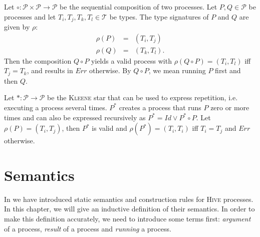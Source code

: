 \begin{definition}
\label{def:static_sequence}
Let $\circ \colon \mathcal{P} \times \mathcal{P} \to \mathcal{P}$ be the sequential composition of two processes. Let $P, Q \in \mathcal{P}$ be processes and let $T_i, T_j, T_k, T_l \in \mathcal{T}$ be types. The type signatures of $P$ and $Q$ are given by $\rho$: 
\begin{eqnarray*}
  \rho \left( P \right) & = & \left( T_i, T_j \right) \\
  \rho \left( Q \right) & = & \left( T_k, T_l \right).
\end{eqnarray*}
Then the composition $Q \circ P$ yields a valid process with $\rho \left( Q \circ P \right) = \left( T_i, T_l \right)$ iff $T_j = T_k$, and results in $Err$ otherwise. By $Q \circ P$, we mean running $P$ first and then $Q$.

\hfill\qedsymbol
\end{definition}


\begin{definition}
\label{def:static_kleene}
Let $* \colon \mathcal{P} \to \mathcal{P}$ be the \textsc{Kleene} star that can be used to express repetition, i.e. executing a process several times. $P^*$ creates a process that runs $P$ zero or more times and can also be expressed recursively as $P^* = Id \vee P^* \circ P$. Let $\rho \left( P \right) = \left( T_i, T_j \right)$, then $P^*$ is valid and $\rho \left( P^* \right) = \left( T_i, T_i \right)$ iff $T_i = T_j$ and $Err$ otherwise.

\hfill\qedsymbol
\end{definition}




\section{Semantics}
\label{chp:semantics}
In  we have introduced static semantics and construction rules for \textsc{Hive} processes. In this chapter, we will give an inductive definition of their semantics. In order to make this definition accurately, we need to introduce some terms first: \textit{argument} of a process, \textit{result} of a process and \textit{running} a process.

